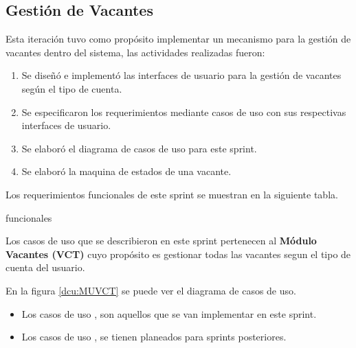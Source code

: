 
\subsection{Gestión de Vacantes}
Esta iteración tuvo como propósito implementar un mecanismo para la gestión de vacantes dentro del sistema, las actividades 
realizadas fueron:
\begin{enumerate}
    \item Se diseñó e implementó las interfaces de usuario para la gestión de vacantes según el tipo de cuenta.
    \item Se especificaron los requerimientos mediante casos de uso con sus respectivas interfaces de usuario.
    \item Se elaboró el diagrama de casos de uso para este sprint.
    \item Se elaboró la maquina de estados de una vacante.
\end{enumerate} 

Los requerimientos funcionales de este sprint se muestran en la siguiente tabla.
\begin{requerimientos}{funcionales}
\end{requerimientos}

Los casos de uso que se describieron en este sprint pertenecen al \textbf{Módulo Vacantes (VCT)} cuyo propósito es gestionar
todas las vacantes segun el tipo de cuenta del usuario.

En la figura \ref{dcu:MUVCT} se puede ver el diagrama de casos de uso.
\begin{itemize}
    \item Los casos de uso \IUazul{} , son aquellos que se van implementar en este sprint.
    \item Los casos de uso \IUblanco{}, se tienen planeados para sprints posteriores.
\end{itemize} 

